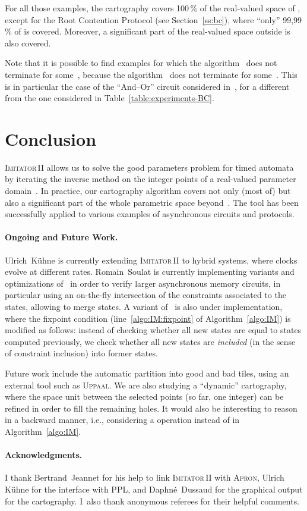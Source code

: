 \documentclass[submission,copyright,creativecommons]{eptcs}
\newcommand{\apron}{\textsc{Apron}}
\newcommand{\imitatordeux}{\textsc{Imitator}\,II}
\newcommand{\uppaal}{\textsc{Uppaal}}
\newcommand{\paragraphe}[1]{\paragraph{#1.}}
\begin{document}
For all those examples, the cartography covers 100\,\% of the real-valued space of , except for the Root Contention Protocol (see Section~\ref{ss:bc}), where ``only'' 99,99\,\% of  is covered.
Moreover, a significant part of the real-valued space outside  is also covered.

Note that it is possible to find examples for which the algorithm~ does not terminate for some~, because the algorithm~ does not terminate for some~.
This is in particular the case of the ``And--Or'' circuit considered in~\cite{cc05}, for a different~ from the one considered in Table~\ref{table:experiments-BC}.



\section{Conclusion} \label{sec:conclusion}


\imitatordeux{} allows us to solve the good parameters problem for timed automata by iterating the inverse method on the integer points of a real-valued parameter domain~.
In practice, our cartography algorithm covers not only (most of)  but also a significant part of the whole parametric space beyond~.
The tool has been successfully applied to various examples of asynchronous circuits and protocols.


\paragraphe{Ongoing and Future Work}
Ulrich~K\"uhne is currently extending \imitatordeux{} to hybrid systems, where clocks evolve at different rates.
Romain~Soulat is currently implementing variants and optimizations of~ in order to verify larger asynchronous memory circuits, in particular using an on-the-fly intersection of the constraints associated to the states, allowing to merge states.
A variant of~ is also under implementation, where the fixpoint condition (line~\ref{algo:IM:fixpoint} of Algorithm~\ref{algo:IM}) is modified as follows: instead of checking whether all new states are equal to states computed previously, we check whether all new states are \emph{included} (in the sense of constraint inclusion) into former states.


Future work include the automatic partition into good and bad tiles, using an external tool such as \uppaal{}. We are also studying a ``dynamic'' cartography, where the space unit between the selected points (so far, one integer) can be refined in order to fill the remaining holes.
It would also be interesting to reason in a backward manner, i.e., considering a  operation instead of  in Algorithm~\ref{algo:IM}.






\paragraphe{Acknowledgments}
I thank Bertrand~Jeannet for his help to link \imitatordeux{} with \apron{}, Ulrich K\"uhne for the interface with PPL, and Daphn\'e~Dussaud for the graphical output for the cartography.
I~also thank anonymous referees for their helpful comments.


 
\end{document}
